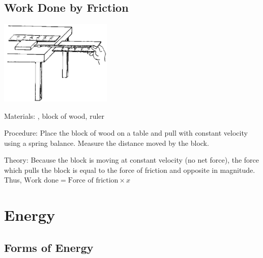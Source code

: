\begin{multicols}{2}
\subsection{Work Done by Friction}

\begin{center}
\includegraphics[width=0.4\textwidth]{./img/source/work-friction.png}
\end{center}

\begin{description*}
\item[Materials:]{, block of wood, ruler}
\item[Procedure:]{Place the block of wood on a table and pull with constant velocity using a spring balance. Measure the distance moved by the block.}
\item[Theory:]{Because the block is moving at constant velocity (no net force), the force which pulls the block is equal to the force of friction and opposite in magnitude. Thus, $\text{Work done} = \text{Force of friction} \times x$}
\end{description*}


\section*{Energy} 


\subsection{Forms of Energy}


\end{multicols}
